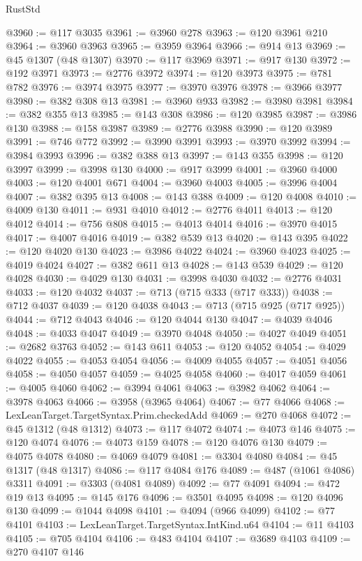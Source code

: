 \begin{lexlean}{RustStd}
\begin{coremodule}
{\begin{coremodule}
{{{{{{{{{{{{{{{{{{{{{{{{{{{{{{{{{{{{{{{{{{{{{{{{{{{{{{{{{{{{@3960 := @117 @3035
@3961 := @3960 @278
@3963 := @120 @3961 @210
@3964 := @3960 @3963
@3965 := @3959 @3964
@3966 := @914 @13
@3969 := @45 @1307 (@48 @1307)
@3970 := @117 @3969
@3971 := @917 @130
@3972 := @192 @3971
@3973 := @2776 @3972
@3974 := @120 @3973
@3975 := @781 @782
@3976 := @3974 @3975
@3977 := @3970 @3976
@3978 := @3966 @3977
@3980 := @382 @308 @13
@3981 := @3960 @933
@3982 := @3980 @3981
@3984 := @382 @355 @13
@3985 := @143 @308
@3986 := @120 @3985
@3987 := @3986 @130
@3988 := @158 @3987
@3989 := @2776 @3988
@3990 := @120 @3989
@3991 := @746 @772
@3992 := @3990 @3991
@3993 := @3970 @3992
@3994 := @3984 @3993
@3996 := @382 @388 @13
@3997 := @143 @355
@3998 := @120 @3997
@3999 := @3998 @130
@4000 := @917 @3999
@4001 := @3960 @4000
@4003 := @120 @4001 @671
@4004 := @3960 @4003
@4005 := @3996 @4004
@4007 := @382 @395 @13
@4008 := @143 @388
@4009 := @120 @4008
@4010 := @4009 @130
@4011 := @931 @4010
@4012 := @2776 @4011
@4013 := @120 @4012
@4014 := @756 @808
@4015 := @4013 @4014
@4016 := @3970 @4015
@4017 := @4007 @4016
@4019 := @382 @539 @13
@4020 := @143 @395
@4022 := @120 @4020 @130
@4023 := @3986 @4022
@4024 := @3960 @4023
@4025 := @4019 @4024
@4027 := @382 @611 @13
@4028 := @143 @539
@4029 := @120 @4028
@4030 := @4029 @130
@4031 := @3998 @4030
@4032 := @2776 @4031
@4033 := @120 @4032
@4037 := @713 (@715 @333 (@717 @333))
@4038 := @712 @4037
@4039 := @120 @4038
@4043 := @713 (@715 @925 (@717 @925))
@4044 := @712 @4043
@4046 := @120 @4044 @130
@4047 := @4039 @4046
@4048 := @4033 @4047
@4049 := @3970 @4048
@4050 := @4027 @4049
@4051 := @2682 @3763
@4052 := @143 @611
@4053 := @120 @4052
@4054 := @4029 @4022
@4055 := @4053 @4054
@4056 := @4009 @4055
@4057 := @4051 @4056
@4058 := @4050 @4057
@4059 := @4025 @4058
@4060 := @4017 @4059
@4061 := @4005 @4060
@4062 := @3994 @4061
@4063 := @3982 @4062
@4064 := @3978 @4063
@4066 := @3958 (@3965 @4064)
@4067 := @77 @4066
@4068 := LexLeanTarget.TargetSyntax.Prim.checkedAdd
@4069 := @270 @4068
@4072 := @45 @1312 (@48 @1312)
@4073 := @117 @4072
@4074 := @4073 @146
@4075 := @120 @4074
@4076 := @4073 @159
@4078 := @120 @4076 @130
@4079 := @4075 @4078
@4080 := @4069 @4079
@4081 := @3304 @4080
@4084 := @45 @1317 (@48 @1317)
@4086 := @117 @4084 @176
@4089 := @487 (@1061 @4086) @3311
@4091 := @3303 (@4081 @4089)
@4092 := @77 @4091
@4094 := @472 @19 @13
@4095 := @145 @176
@4096 := @3501 @4095
@4098 := @120 @4096 @130
@4099 := @1044 @4098
@4101 := @4094 (@966 @4099)
@4102 := @77 @4101
@4103 := LexLeanTarget.TargetSyntax.IntKind.u64
@4104 := @11 @4103
@4105 := @705 @4104
@4106 := @483 @4104
@4107 := @3689 @4103
@4109 := @270 @4107 @146
}}}}}}}}}}}}}}}}}}}}}}}}}}}}}}}}}}}}}}}}}}}}}}}}}}}}}}}}}}}}
\end{coremodule}}
\end{coremodule}
\end{lexlean}

